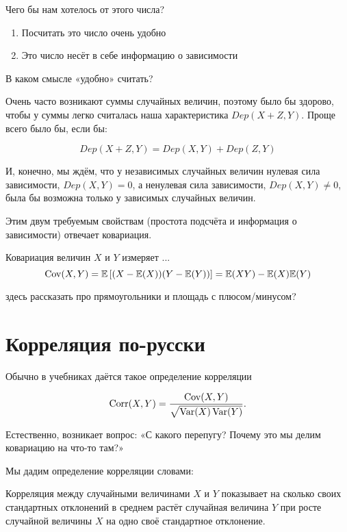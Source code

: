 \documentclass[10pt]{article}
\begin{document}
Чего бы нам хотелось от этого числа?
\begin{enumerate}
\item Посчитать это число очень удобно
\item Это число несёт в себе информацию о зависимости
\end{enumerate}

В каком смысле «удобно» считать?

Очень часто возникают суммы случайных величин, поэтому было бы здорово, чтобы у суммы легко считалась наша характеристика $Dep(X+Z,Y)$. Проще всего было бы, если бы:

\[
Dep(X+Z,Y)=Dep(X,Y)+Dep(Z,Y)
\]

И, конечно, мы ждём, что у независимых случайных величин нулевая сила зависимости, $Dep(X,Y)=0$, а ненулевая сила зависимости, $Dep(X,Y)\neq 0$, была бы возможна только у зависимых случайных величин.

Этим двум требуемым свойствам (простота подсчёта и информация о зависимости) отвечает ковариация.

\begin{definition}
Ковариация величин $X$ и $Y$ измеряет ...
\[
\operatorname{Cov}(X,Y)=\mathbb{E}\left[  (X-\mathbb{E}(X)) (Y-\mathbb{E}(Y))   \right] = \mathbb{E}(XY)-\mathbb{E}(X)\mathbb{E}(Y)
\]
\end{definition}

здесь рассказать про прямоугольники и площадь с плюсом/минусом?

\section{Корреляция по-русски}

Обычно в учебниках даётся такое определение корреляции

\begin{equation}
\label{def_corr}
\operatorname{Corr}(X,Y)=\frac{\operatorname{Cov}(X,Y)}{\sqrt{\operatorname{Var}(X)\operatorname{Var}(Y)}}.
\end{equation}

Естественно, возникает вопрос: «С какого перепугу? Почему это мы делим ковариацию на что-то там?»

Мы дадим определение корреляции словами:

\begin{definition}
Корреляция между случайными величинами $X$ и $Y$ показывает на сколько своих стандартных отклонений в среднем растёт случайная величина $Y$ при росте случайной величины $X$ на одно своё стандартное отклонение.
\end{definition}
\end{document}
